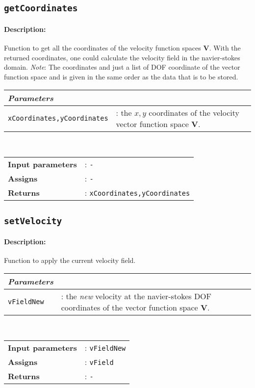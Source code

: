 \subsection{\texttt{getCoordinates}}
	\paragraph{Description:} Function to get all the coordinates of the velocity function spaces $\mathbf{V}$. With the returned coordinates, one could calculate the velocity field in the navier-stokes domain. \textit{Note}: The coordinates and just a list of DOF coordinate of the vector function space and is given in the same order as the data that is to be stored.\\
	
	    \begin{tabular}{lp{10cm}}
			\textit{Parameters} & \\ \hline
			\texttt{xCoordinates,yCoordinates} &: the $x,y$ coordinates of the velocity vector function space $\mathbf{V}$. \\		
		\end{tabular} \vspace{5 mm}
	\\		
	\begin{tabular}{lp{10cm}}
		\textbf{Input parameters} &: \texttt{-}\\ 
		\textbf{Assigns} &: \texttt{-}\\ 			
		\textbf{Returns} &: \texttt{xCoordinates,yCoordinates}\\ 					
	\end{tabular}

\subsection{\texttt{setVelocity}}
	\paragraph{Description:} Function to apply the current velocity field.\\
	
	    \begin{tabular}{lp{10cm}}
			\textit{Parameters} & \\ \hline
			\texttt{vFieldNew} &: the \textit{new} velocity at the navier-stokes DOF coordinates of the vector function space $\mathbf{V}$.\\		
		\end{tabular} \vspace{5 mm}
	\\		
	\begin{tabular}{lp{10cm}}
		\textbf{Input parameters} &: \texttt{vFieldNew}\\ 
		\textbf{Assigns} &: \texttt{vField}\\ 			
		\textbf{Returns} &: \texttt{-}\\ 					
	\end{tabular}
	
